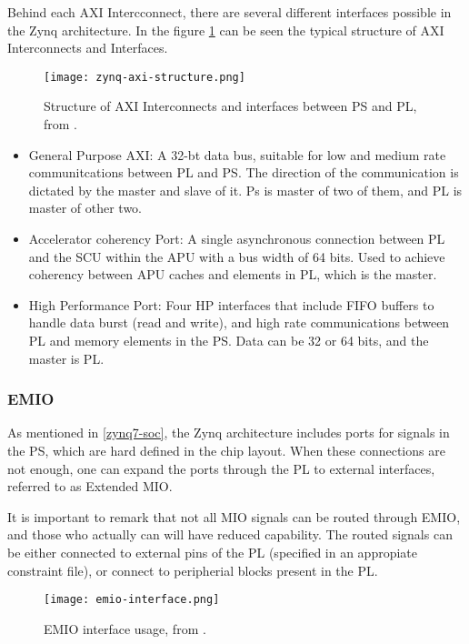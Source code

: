 Behind each AXI Intercconnect, there are several different interfaces possible in the Zynq
architecture. In the figure \ref{fig:zynq-axi-structure} can be seen the typical structure of AXI
Interconnects and Interfaces.

\begin{figure}[htp]
	\centering
	\texttt{[image: zynq-axi-structure.png]}
	\caption{Structure of AXI Interconnects and interfaces between PS and PL, from
	\cite{Crokett2014}.} \label{fig:zynq-axi-structure}
\end{figure}

\begin{itemize}
	\item General Purpose AXI: A 32-bt data bus, suitable for low and medium rate communitcations
	between PL and PS. The direction of the communication is dictated by the master and slave of it.
	Ps is master of two of them, and PL is master of other two.
	\item Accelerator coherency Port: A single asynchronous connection between PL and the SCU within
	the APU with a bus width of 64 bits. Used to achieve coherency between APU caches and elements
	in PL, which is the master.
	\item High Performance Port: Four HP interfaces that include FIFO buffers to handle data burst
	(read and write), and high rate communications between PL and memory elements in the PS. Data
	can be 32 or 64 bits, and the master is PL.
\end{itemize}

\subsubsection*{EMIO}

As mentioned in \ref{zynq7-soc}, the Zynq architecture includes ports for signals in the PS, which
are hard defined in the chip layout. When these connections are not enough, one can expand the ports
through the PL to external interfaces, referred to as Extended MIO.

It is important to remark that not all MIO signals can be routed through EMIO, and those who
actually can will have reduced capability. The routed signals can be either connected to external
pins of the PL (specified in an appropiate constraint file), or connect to peripherial blocks
present in the PL.

\begin{figure}[htp]
	\centering
	\texttt{[image: emio-interface.png]}
	\caption{EMIO interface usage, from \cite{Crokett2014}.} \label{fig:emio-interface}
\end{figure}
